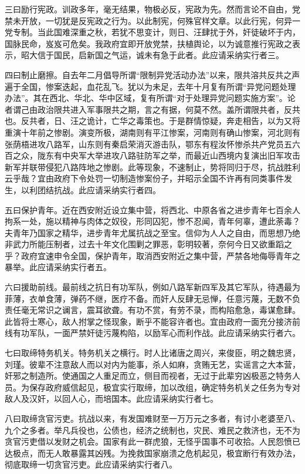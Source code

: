 三曰励行宪政。训政多年，毫无结果，物极必反，宪政为先。然而言论不自由，党禁未开放，一切犹是反宪政之行为。以此制宪，何殊官样文章。以此行宪，何异一党专制。当此国难深重之秋，若犹不思变计，则日、汪肆扰于外，奸徒破坏于内，国脉民命，岌岌可危矣。我政府宜即开放党禁，扶植舆论，以为诚意推行宪政之表示，昭大信于国民，启新国之气运，诚未有急于此者。此应请采纳实行者三。

四曰制止磨擦。自去年二月倡导所谓“限制异党活动办法”以来，限共溶共反共之声遍于全国，惨案迭起，血花乱飞。犹以为未足，去年十月复有所谓“异党问题处理办法”。其在西北、华北、华中区域，复有所谓“对于处理异党问题实施方案”。论者谓己由政治限共进入军事限共之期，言之有据，何莫不然。盖所谓限共者，反共也。反共者，日、汪之诡计，亡华之毒策也。于是群情惊疑，奔走相告，以为又将重演十年前之惨剧。演变所极，湖南则有平江惨案，河南则有确山惨案，河北则有张荫梧进攻八路军，山东则有秦启荣消灭游击队，鄂东有程汝怀惨杀共产党员五六百之众，陇东有中央军大举进攻八路驻防军之举，而最近山西境内复演出旧军攻击新军并联带侵犯八路阵地之惨剧。此等现象，不速制止，势将同归于尽，抗战胜利云乎哉？宜由政府下令处罚一切制造惨案份子，并昭示全国不许再有同类事件发生，以利团结抗战。此应请采纳实行者四。

五曰保护青年。近在西安附近设立集中营，将西北、中原各省之进步青年七百余人拘系一处，施以精神与肉体之奴役，形同囚犯，惨不忍闻，青年何辜，遭此荼毒？夫青年乃国家之精华，进步青年尤属抗战之至宝。信仰为人人之自由，而思想乃绝非武力所能压制者，过去十年文化围剿之罪恶，彰明较著，奈何今日又欲重蹈之乎？政府宜速申令全国，保护青年，取消西安附近之集中营，严禁各地侮辱青年之暴举。此应请采纳实行者五。

六曰援助前线。最前线之抗日有功军队，例如八路军新四军及其它军队，待遇最为菲薄，衣单食薄，弹药不继，医疗不备。而奸人反肆无忌惮，任意污蔑，无数不负责任毫无常识之谰言，震耳欲聋。有功不赏，有劳不录，而构陷愈急，毒谋愈肆。此皆将士寒心，敌人拊掌之怪现象，断乎不能容许者也。宜由政府一面充分接济前线有功军队，一面严禁奸徒污蔑构陷，以励军心而利作战。此应请采纳实行者六。

七曰取缔特务机关。特务机关之横行。时人比诸唐之周兴，来俊臣，明之魏忠贤，刘瑾。彼辈不注意敌人而以对内为能事，杀人如麻，贪贿无艺，实谣言之大本营，奸邪之制造所。使通国之人重足而立，侧目而视者，无过于此辈穷凶极恶之特务人员。为保存政府威信起见，极宜实行取缔，加以改组，确定特务机关之任务为专对敌人及汉奸，以回人心，而培国本。此应请采纳实行者七。

八曰取缔贪官污吏。抗战以来，有发国难财至一万万元之多者，有讨小老婆至八、九个之多者。举凡兵役也，公债也，经济之统制也，灾民、难民之救济也，无不为贪官污吏借以发财之机会。国家有此一群虎狼，无怪乎国事不可收拾。人民怨愤已达极点，而无人敢暴露其凶残。为挽救国家崩溃之危机起见，极宜断行有效办法，彻底取缔一切贪官污吏。此应请采纳实行者八。

